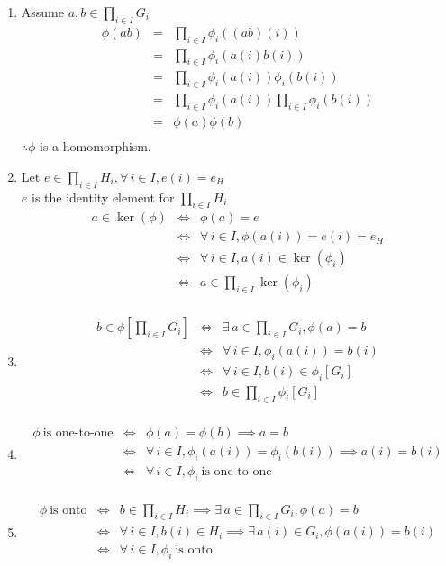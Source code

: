 \documentclass[letterpaper,12pt,fleqn]{article}
\newcommand{\p}{\phi}
\newcommand{\xprod}[1]{\prod_{i\in I}#1_i}
\begin{document}
\begin{theproof}
  \listbreak
  \begin{enumerate}
  \item Assume $a,b\in\xprod{G}$
    \begin{eqnarray*}
      \p(ab) &=& \prod_{i\in I}\p_i((ab)(i)) \\
      &=& \prod_{i\in I}\p_i(a(i)b(i)) \\
      &=& \prod_{i\in I}\p_i(a(i))\p_i(b(i)) \\
      &=& \prod_{i\in I}\p_i(a(i))\prod_{i\in I}\p_i(b(i)) \\
      &=& \p(a)\p(b) \\
    \end{eqnarray*}
    $\therefore\p$ is a homomorphism.

  \item Let $e\in\xprod{H},\forall\,i\in I,e(i)=e_H$ \\
    $e$ is the identity element for $\xprod{H}$
    \begin{eqnarray*}
      a\in\ker(\p) &\iff& \p(a)=e \\
      &\iff& \forall\,i\in I,\p(a(i))=e(i)=e_H \\
      &\iff& \forall\,i\in I,a(i)\in\ker(\p_i) \\
      &\iff& a\in\prod_{i\in I}\ker(\p_i) \\
    \end{eqnarray*}

  \item \begin{eqnarray*}
    b\in\p\left[\xprod{G}\right] &\iff& \exists\,a\in\xprod{G},\p(a)=b \\
    &\iff& \forall\,i\in I,\p_i(a(i))=b(i) \\
    &\iff&\forall\,i\in I,b(i)\in\p_i[G_i] \\
    &\iff& b\in\prod_{i\in I}\p_i[G_i] \\
  \end{eqnarray*}

  \item \begin{eqnarray*}
    \p\ \mbox{is one-to-one} &\iff& \p(a)=\p(b)\implies a=b \\
    &\iff& \forall\,i\in I,\p_i(a(i))=\p_i(b(i))\implies a(i)=b(i) \\
    &\iff& \forall\,i\in I,\p_i\ \mbox{is one-to-one} \\
  \end{eqnarray*}

  \item \begin{eqnarray*}
    \p\ \mbox{is onto} &\iff&
    b\in\xprod{H}\implies\exists\,a\in\xprod{G},\p(a)=b \\
    &\iff& \forall\,i\in I,b(i)\in H_i\implies\exists\,a(i)\in G_i,
    \p(a(i))=b(i) \\
    &\iff& \forall\,i\in I,\p_i\ \mbox{is onto} \\
  \end{eqnarray*}
  \end{enumerate}
\end{theproof}
\end{document}
